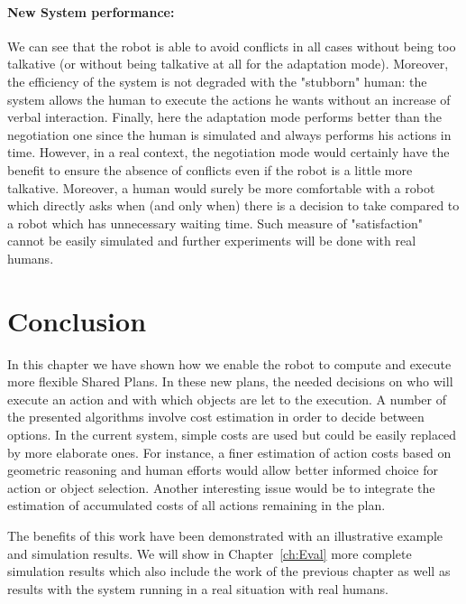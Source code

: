 \documentclass[english,a4paper,11pt,twoside]{StyleThese}
\begin{document}
\paragraph{New System performance:} We can see that the robot is able to avoid conflicts in all cases without being too talkative (or without being talkative at all for the adaptation mode). Moreover, the efficiency of the system is not degraded with the "stubborn" human: the system allows the human to execute the actions he wants without an increase of verbal interaction. 
Finally, here the adaptation mode performs better than the negotiation one since the human is simulated and always performs his actions in time. However, in a real context, the negotiation mode would certainly have the benefit to ensure the absence of conflicts even if the robot is a little more talkative. Moreover, a human would surely be more comfortable with a robot which directly asks when (and only when) there is a decision to take compared to a robot which has unnecessary waiting time. Such measure of "satisfaction" cannot be easily simulated and further experiments will be done with real humans.

\section{Conclusion}

In this chapter we have shown how we enable the robot to compute and execute more flexible Shared Plans. In these new plans, the needed decisions on who will execute an action and with which objects are let to the execution. A number of the presented algorithms involve cost estimation in order to decide between options. In the current system, simple costs are used but could be easily replaced by more elaborate ones. For instance, a finer estimation of action costs based on geometric reasoning and human efforts would allow better informed choice for action or object selection. Another interesting issue would be to integrate the estimation of accumulated costs of all actions remaining in the plan.

The benefits of this work have been demonstrated with an illustrative example and simulation results. We will show in Chapter~\ref{ch:Eval} more complete simulation results which also include the work of the previous chapter as well as results with the system running in a real situation with real humans.


\ifdefined{}
\else


\end{document}
